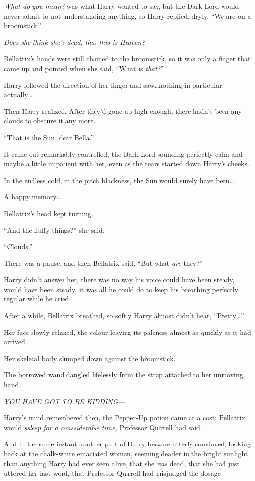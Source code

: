 \emph{What do you mean?} was what Harry wanted to say, but the Dark Lord would
never admit to not understanding anything, so Harry replied, dryly, “We are on
a broomstick.”

\emph{Does she think she’s dead, that this is Heaven?}

Bellatrix’s hands were still chained to the broomstick, so it was only a finger
that came up and pointed when she said, “What is \emph{that?}”

Harry followed the direction of her finger and saw…nothing in
particular, actually…

Then Harry realized. After they’d gone up high enough, there hadn’t been any
clouds to obscure it any more.

“That is the Sun, dear Bella.”

It came out remarkably controlled, the Dark Lord sounding perfectly calm and
maybe a little impatient with her, even as the tears started down Harry’s
cheeks.

In the endless cold, in the pitch blackness, the Sun would surely have
been…

A happy memory…

Bellatrix’s head kept turning.

“And the fluffy things?” she said.

“Clouds.”

There was a pause, and then Bellatrix said, “But what \emph{are} they?”

Harry didn’t answer her, there was no way his voice could have been steady,
would have been steady, it was all he could do to keep his breathing perfectly
regular while he cried.

After a while, Bellatrix breathed, so softly Harry almost didn’t hear,
“Pretty…”

Her face slowly relaxed, the colour leaving its paleness almost as quickly as it
had arrived.

Her skeletal body slumped down against the broomstick.

The borrowed wand dangled lifelessly from the strap attached to her unmoving
hand.

\emph{YOU HAVE GOT TO BE KIDDING—}

Harry’s mind remembered then, the Pepper-Up potion came at a cost; Bellatrix
would \emph{ssleep for a conssiderable time,} Professor Quirrell had said.

And in the same instant another part of Harry became utterly convinced, looking
back at the chalk-white emaciated woman, seeming deader in the bright sunlight
than anything Harry had ever seen alive, that she \emph{was} dead, that she had
just uttered her last word, that Professor Quirrell had misjudged the dosage—

